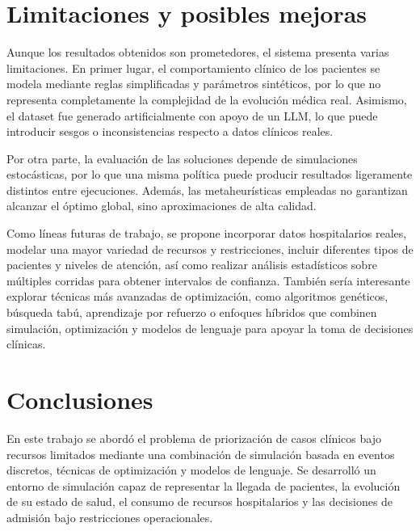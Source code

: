 \documentclass[12pt,a4paper]{article}
\begin{document}
\section{Limitaciones y posibles mejoras}

Aunque los resultados obtenidos son prometedores, el sistema presenta varias limitaciones. 
En primer lugar, el comportamiento clínico de los pacientes se modela mediante reglas simplificadas y parámetros sintéticos, 
por lo que no representa completamente la complejidad de la evolución médica real. 
Asimismo, el dataset fue generado artificialmente con apoyo de un LLM, lo que puede introducir sesgos o 
inconsistencias respecto a datos clínicos reales.

Por otra parte, la evaluación de las soluciones depende de simulaciones estocásticas, 
por lo que una misma política puede producir resultados ligeramente distintos entre ejecuciones. 
Además, las metaheurísticas empleadas no garantizan alcanzar el óptimo global, sino aproximaciones de alta calidad.

Como líneas futuras de trabajo, se propone incorporar datos hospitalarios reales, modelar una mayor variedad de recursos y 
restricciones, incluir diferentes tipos de pacientes y niveles de atención, 
así como realizar análisis estadísticos sobre múltiples corridas para obtener intervalos de confianza. 
También sería interesante explorar técnicas más avanzadas de optimización, como algoritmos genéticos, 
búsqueda tabú, aprendizaje por refuerzo o enfoques híbridos que combinen simulación, 
optimización y modelos de lenguaje para apoyar la toma de decisiones clínicas.

\section{Conclusiones}

En este trabajo se abordó el problema de priorización de casos clínicos bajo recursos limitados mediante 
una combinación de simulación basada en eventos discretos, técnicas de optimización y modelos de lenguaje. 
Se desarrolló un entorno de simulación capaz de representar la llegada de pacientes, la evolución de su estado de salud, 
el consumo de recursos hospitalarios y las decisiones de admisión bajo restricciones operacionales.
\end{document}
